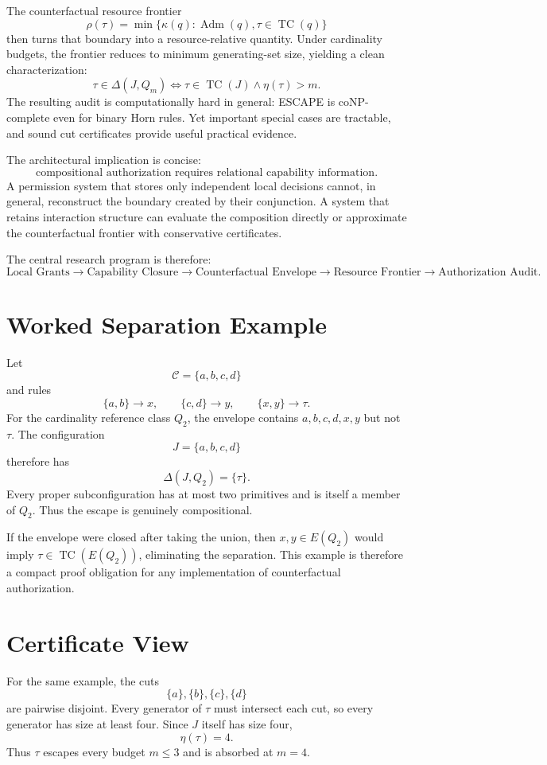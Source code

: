 \documentclass[11pt]{article}
\newcommand{\TC}{\operatorname{TC}}
\newcommand{\Adm}{\operatorname{Adm}}
\newcommand{\rhoCF}{\rho}
\newcommand{\etaMin}{\eta}
\newcommand{\Cset}{\mathcal C}
\begin{document}
The counterfactual resource frontier
\[
\rhoCF(\tau)=
\min\{\kappa(q):\Adm(q),\tau\in\TC(q)\}
\]
then turns that boundary into a resource-relative quantity. Under cardinality budgets, the frontier reduces to minimum generating-set size, yielding a clean characterization:
\[
\tau\in\Delta(J,Q_m)
\iff
\tau\in\TC(J)\land\etaMin(\tau)>m.
\]
The resulting audit is computationally hard in general: ESCAPE is coNP-complete even for binary Horn rules. Yet important special cases are tractable, and sound cut certificates provide useful practical evidence.

The architectural implication is concise:
\[
\boxed{
\text{compositional authorization requires relational capability information.}
}
\]
A permission system that stores only independent local decisions cannot, in general, reconstruct the boundary created by their conjunction. A system that retains interaction structure can evaluate the composition directly or approximate the counterfactual frontier with conservative certificates.

The central research program is therefore:
\[
\boxed{
\text{Local Grants}
\rightarrow
\text{Capability Closure}
\rightarrow
\text{Counterfactual Envelope}
\rightarrow
\text{Resource Frontier}
\rightarrow
\text{Authorization Audit}.
}
\]

\appendix

\section{Worked Separation Example}

Let
\[
\Cset=\{a,b,c,d\}
\]
and rules
\[
\{a,b\}\to x,\qquad
\{c,d\}\to y,\qquad
\{x,y\}\to\tau.
\]
For the cardinality reference class $Q_2$, the envelope contains $a,b,c,d,x,y$ but not $\tau$. The configuration
\[
J=\{a,b,c,d\}
\]
therefore has
\[
\Delta(J,Q_2)=\{\tau\}.
\]
Every proper subconfiguration has at most two primitives and is itself a member of $Q_2$. Thus the escape is genuinely compositional.

If the envelope were closed after taking the union, then $x,y\in E(Q_2)$ would imply $\tau\in\TC(E(Q_2))$, eliminating the separation. This example is therefore a compact proof obligation for any implementation of counterfactual authorization.

\section{Certificate View}

For the same example, the cuts
\[
\{a\},\{b\},\{c\},\{d\}
\]
are pairwise disjoint. Every generator of $\tau$ must intersect each cut, so every generator has size at least four. Since $J$ itself has size four,
\[
\etaMin(\tau)=4.
\]
Thus $\tau$ escapes every budget $m\le3$ and is absorbed at $m=4$.
\end{document}
